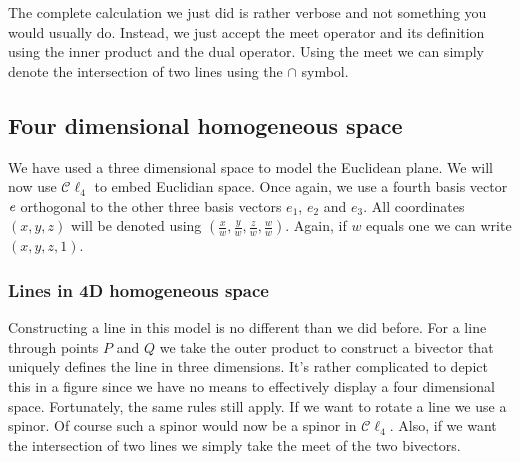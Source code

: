 \documentclass[10pt]{report}
\begin{document}
The complete calculation we just did is rather verbose and not
something you would usually do. Instead, we just accept the meet
operator and its definition using the inner product and the dual
operator. Using the meet we can simply denote the intersection of
two lines using the $\cap$ symbol.

\subsection{Four dimensional homogeneous space}

We have used a three dimensional space to model the Euclidean
plane. We will now use $\mathcal{C}\ell_4$ to embed Euclidian
space. Once again, we use a fourth basis vector $\emph{e}$
orthogonal to the other three basis vectors $e_1$, $e_2$ and
$e_3$. All coordinates $(x, y, z)$ will be denoted using
$(\frac{x}{w}, \frac{y}{w}, \frac{z}{w}, \frac{w}{w})$. Again, if
$w$ equals one we can write $(x, y, z, 1)$.

\subsubsection{Lines in 4D homogeneous space}

Constructing a line in this model is no different than we did
before. For a line through points $P$ and $Q$ we take the outer
product to construct a bivector that uniquely defines the line in
three dimensions. It's rather complicated to depict this in a
figure since we have no means to effectively display a four
dimensional space. Fortunately, the same rules still apply. If we
want to rotate a line we use a spinor. Of course such a spinor
would now be a spinor in $\mathcal{C}\ell_4$. Also, if we want the
intersection of two lines we simply take the meet of the two
bivectors.
\end{document}
